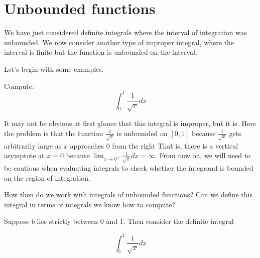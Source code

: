 \documentclass{ximera}
\begin{document}
\section{Unbounded functions}

We have just considered definite integrals where the interval of
integration was unbounded. We now consider another type of improper
integral, where the interval is finite but the function is unbounded on the interval. 




Let's begin with some examples.

\begin{example}	
  Compute:
  \[
  \int_{0}^1 \frac{1}{\sqrt{x}} dx
  \]
  \begin{explanation}
It may not be obvious at first glance that this integral is improper, but it is.  Here the problem is that the function $\frac{1}{\sqrt{x}}$ is unbounded on $[0,1]$ because $\frac{1}{\sqrt{x}}$ gets arbitrarily large as $x$ approaches $0$ from the right That is, there is a vertical asymptote at $x=0$ because $\lim_{x \to 0^+} \frac{1}{\sqrt{x}} dx = \infty$. From now on, we will need to be cautious when evaluating integrals to check whether the integrand is bounded on the region of integration. 

How then do we work with integrals of unbounded functions?  Can we define this integral in terms of integrals we know how to compute?

Suppose $b$ lies strictly between $0$ and $1$. Then consider the definite integral

\[
\int_{b}^{1} \frac{1}{\sqrt{x}} dx
\]

\begin{image}
\end{image}


\end{explanation}
\end{example}
\end{document}
